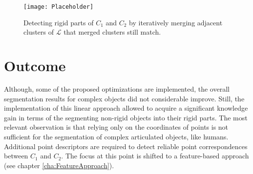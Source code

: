 \begin{figure}
	\centering
	\texttt{[image: Placeholder]}
	\caption{Detecting rigid parts of $C_1$ and $C_2$ by iteratively merging adjacent clusters of $\mathcal{L}$ that merged clusters still match.}
	\label{fig:ICPforLRP}
\end{figure}

\section{Outcome}
Although, some of the proposed optimizations are implemented, the overall segmentation results for complex objects did not considerable improve.  Still, the implementation of this linear approach allowed to acquire a significant knowledge gain in terms of the segmenting non-rigid objects into their rigid parts. The most relevant observation is that relying only on the coordinates of points is not sufficient for the segmentation of complex articulated objects, like humans. Additional point descriptors are required to detect reliable point correspondences between $C_1$ and $C_2$. The focus at this point is shifted to a feature-based approach (see chapter \ref{cha:FeatureApproach}).

